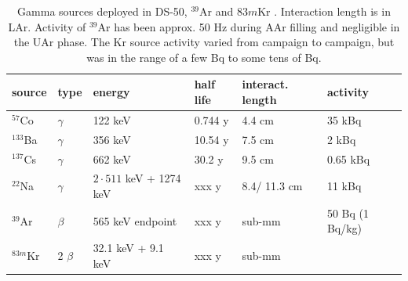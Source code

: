 \begin{table}[htbp]
\centering
\caption{Gamma sources deployed in DS-50, $^{39}$Ar and $83m$Kr \cite{Lippincott:2010jb}. Interaction length is in LAr. Activity of $^{39}$Ar has been approx. 50 Hz during AAr filling and negligible in the UAr phase. The Kr source activity varied from campaign to campaign, but was in the range of a few Bq to some tens of Bq.} %
\centering
\begin{tabular}{|l|l|l|l|l|l|}
\hline
\textbf{source} & \textbf{type} & \textbf{energy} & \textbf{half life} & \textbf{interact. length} & \textbf{activity} \\ \hline
$^{57}$Co & $\gamma$ & 122 keV & 0.744 y & 4.4 cm & 35 kBq \\ \hline
$^{133}$Ba & $\gamma$ & 356 keV & 10.54 y & 7.5 cm & 2 kBq \\ \hline
$^{137}$Cs & $\gamma$ & 662 keV & 30.2 y & 9.5 cm & 0.65 kBq \\ \hline
$^{22}$Na & $\gamma$ & $2\cdot 511$ keV + 1274 keV & xxx y & 8.4/ 11.3 cm & 11 kBq \\ \hline\hline
$^{39}$Ar & $\beta$ &  565 keV endpoint& xxx y & sub-mm & 50 Bq (1 Bq/kg) \\ \hline
$^{83m}$Kr & 2 $\beta$ &  32.1 keV + 9.1 keV & xxx y & sub-mm & \\ \hline
\end{tabular}
\label{tbl:GammaSources}
\end{table}

